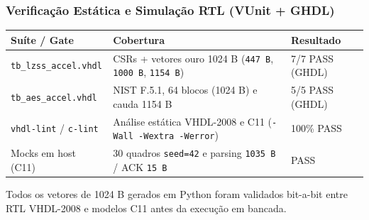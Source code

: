 \begin{frame}
  \frametitle{Verifica\c{c}\~ao Est\'atica e Simula\c{c}\~ao RTL (VUnit + GHDL)}
  \scriptsize
  \renewcommand{\arraystretch}{1.2}
  \begin{tabular}{@{}lll@{}}
    \toprule
    \textbf{Su\'ite / Gate} & \textbf{Cobertura} & \textbf{Resultado}\\
    \midrule
    \texttt{tb\_lzss\_accel.vhdl} & CSRs + vetores ouro 1024 B (\texttt{447 B}, \texttt{1000 B}, \texttt{1154 B}) & 7/7 PASS (GHDL)\\
    \texttt{tb\_aes\_accel.vhdl} & NIST F.5.1, 64 blocos (1024 B) e cauda 1154 B & 5/5 PASS (GHDL)\\
    \texttt{vhdl-lint} / \texttt{c-lint} & An\'alise est\'atica VHDL-2008 e C11 (\texttt{-Wall -Wextra -Werror}) & 100\% PASS\\
    Mocks em host (C11) & 30 quadros \texttt{seed=42} e parsing \texttt{1035 B} / ACK \texttt{15 B} & PASS\\
    \bottomrule
  \end{tabular}
  \par\vspace{1.2ex}
  \begin{pontoschave}
    \small Todos os vetores de 1024 B gerados em Python foram validados bit-a-bit entre RTL VHDL-2008 e modelos C11 antes da execu\c{c}\~ao em bancada.
  \end{pontoschave}
\end{frame}
